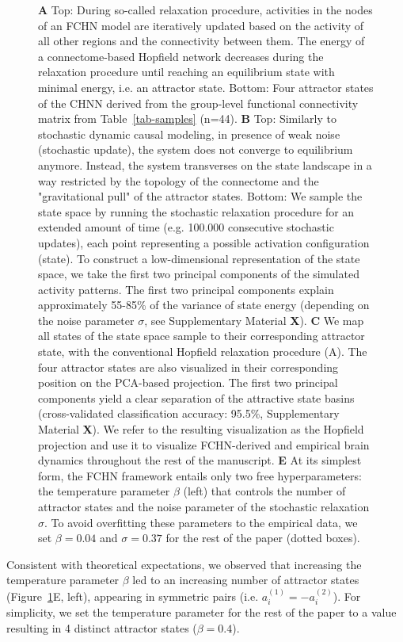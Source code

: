 \documentclass{article}
\begin{document}
\begin{figure}[!htbp]
{\textbf{A} Top: During so-called relaxation procedure, activities in the nodes of an FCHN model are iteratively updated based on the activity of all other regions and the connectivity between them. The energy of a
connectome-based Hopfield network decreases during the relaxation procedure until reaching an equilibrium state with
minimal energy, i.e. an attractor state. Bottom: Four attractor states of the CHNN derived from the
group-level functional connectivity matrix from Table~\ref{tab-samples} (n=44).
\textbf{B} Top: Similarly to stochastic dynamic causal modeling, in presence of weak noise (stochastic update), the system
does not converge to equilibrium anymore. Instead, the system transverses on the state landscape in a way
restricted by the topology of the connectome and the "gravitational pull" of the attractor states. Bottom: We sample
the state space by running the stochastic relaxation procedure for an extended amount of time (e.g. 100.000 consecutive
stochastic updates), each point representing a possible activation configuration (state). To construct a
low-dimensional representation of the state space, we take the first two principal components of the simulated activity
patterns. The first two principal components explain approximately 55-85\% of the variance of state energy (depending
on the noise parameter $\sigma$, see Supplementary Material \textbf{X}).
\textbf{C} We map all states of the state space sample to their corresponding attractor state, with the conventional
Hopfield relaxation procedure (A). The four attractor states are also visualized in their corresponding position on the
PCA-based projection. The first two principal components yield a clear separation of the attractive state basins
(cross-validated classification accuracy: 95.5\%, Supplementary Material \textbf{X}). We refer to the resulting visualization
as the Hopfield projection and use it to visualize FCHN-derived and empirical brain dynamics throughout the rest of
the manuscript.
\textbf{E} At its simplest form, the FCHN framework entails only two free hyperparameters: the temperature parameter
$\beta$ (left) that controls the number of attractor states and the noise parameter of the stochastic relaxation
$\sigma$. To avoid overfitting these parameters to the empirical data, we set $\beta=0.04$ and $\sigma=0.37$ for the
rest of the paper  (dotted boxes).}
\label{attractors}
\end{figure}

Consistent with theoretical expectations, we observed that increasing the temperature parameter $\beta$ led to an
increasing number of attractor states (Figure~\ref{attractors}E, left), appearing in symmetric pairs
(i.e. $a_i^{(1)} = -a_i^{(2)}$). For simplicity, we set the temperature parameter for the rest of the paper to a value
resulting in 4 distinct attractor states ($\beta=0.4$).
\end{document}
